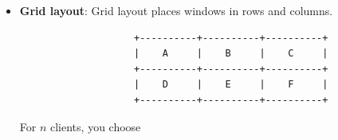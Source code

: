\documentclass{report}
\begin{document}
\begin{itemize}
            \begin{verbatim}
                +-------------------------------+
                |                               |
                |          Window A             |
                |          Window B             |
                |          Window C             |
                |                               |
                +-------------------------------+
            \end{verbatim}
            \bigbreak \noindent 
            They are all the same size, but only the topmost/focused one is visible.
            \begin{itemize}
                \item \textbf{Monocle}: The WM still manages the window normally.
                    \bigbreak \noindent 
                    You may keep borders, gaps, and panels visible depending on your design.
                \item \textbf{Fullscreen}: Fullscreen is usually a special state.
                    \bigbreak \noindent 
                    A fullscreen client should typically:
                    \begin{itemize}
                        cover the entire monitor,
                        ignore gaps,
                        ignore borders or use border width 0,
                        appear above normal tiled clients,
                        possibly cover bars/panels,
                        be excluded from normal tiling.
                    \end{itemize}
                    In EWMH-aware WMs, fullscreen often corresponds to:
                    \bigbreak \noindent 
                    \begin{cppcode}
                    _NET_WM_STATE_FULLSCREEN
                    \end{cppcode}
            \end{itemize}
            \item \textbf{Grid layout}: Grid layout places windows in rows and columns.
                \begin{verbatim}
                    +----------+----------+----------+
                    |    A     |    B     |    C     |
                    +----------+----------+----------+
                    |    D     |    E     |    F     |
                    +----------+----------+----------+
                \end{verbatim}
                \bigbreak \noindent 
                For $n$ clients, you choose

\end{itemize}
\end{document}
